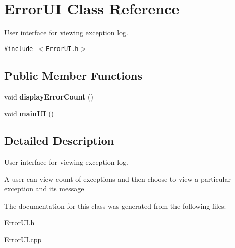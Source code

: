 \hypertarget{class_error_u_i}{
\section{Error\-UI Class Reference}
\label{class_error_u_i}
}
User interface for viewing exception log.  


{\tt \#include $<$Error\-UI.h$>$}

\subsection*{Public Member Functions}
\begin{CompactItemize}
\item 
\hypertarget{class_error_u_i_c220b0cf73dd91d6e72ec18ed4817496}{
void {\bf display\-Error\-Count} ()}
\label{class_error_u_i_c220b0cf73dd91d6e72ec18ed4817496}

\item 
\hypertarget{class_error_u_i_3c76ebf8f201727c96b59855cb91ddf1}{
void {\bf main\-UI} ()}
\label{class_error_u_i_3c76ebf8f201727c96b59855cb91ddf1}

\end{CompactItemize}


\subsection{Detailed Description}
User interface for viewing exception log. 

A user can view count of exceptions and then choose to view a particular exception and its message 



The documentation for this class was generated from the following files:\begin{CompactItemize}
\item 
Error\-UI.h\item 
Error\-UI.cpp\end{CompactItemize}
